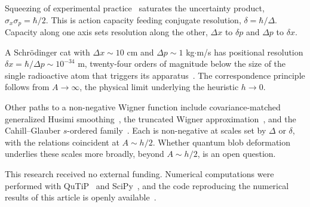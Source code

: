 \documentclass[aps,prl,reprint,amsmath,amssymb,floatfix,nofootinbib]{revtex4-2}
\begin{document}
Squeezing of experimental practice~\cite{walls1983} saturates the uncertainty product, $\sigma_x \sigma_p = \hbar/2$. This is action capacity feeding conjugate resolution, $\delta = \hbar/\Delta$. Capacity along one axis sets resolution along the other, $\Delta x$ to $\delta p$ and $\Delta p$ to $\delta x$.

A Schr\"odinger cat with $\Delta x \sim 10$ cm and $\Delta p \sim 1$ kg$\cdot$m/s has positional resolution $\delta x = \hbar/\Delta p \sim 10^{-34}$ m, twenty-four orders of magnitude below the size of the single radioactive atom that triggers its apparatus~\cite{schrodinger1935trimmer}. The correspondence principle follows from $A \to \infty$, the physical limit underlying the heuristic $h \to 0$.

Other paths to a non-negative Wigner function include covariance-matched generalized Husimi smoothing~\cite{husimi1940,hudson1974,cartwright1976}, the truncated Wigner approximation~\cite{polkovnikov2010}, and the Cahill--Glauber $s$-ordered family~\cite{cahillglauber1969}. Each is non-negative at scales set by $\Delta$ or $\delta$, with the relations coincident at $A \sim h/2$. Whether quantum blob deformation underlies these scales more broadly, beyond $A \sim h/2$, is an open question.


\begin{acknowledgments}
This research received no external funding. Numerical computations were performed with QuTiP~\cite{qutip5} and SciPy~\cite{scipy}, and the code reproducing the numerical results of this article is openly available~\cite{zenododeposit}.
\end{acknowledgments}


\end{document}
